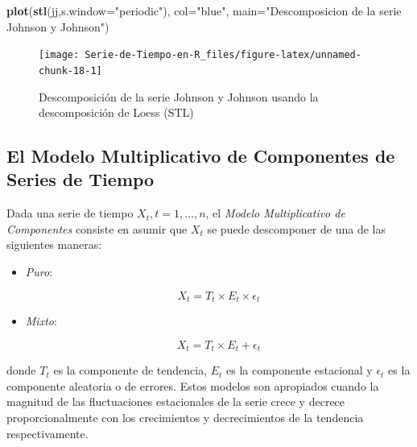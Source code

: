 \documentclass[12pt,]{krantz}
\makeatletter
\newenvironment{Shaded}{\begin{snugshade}}{\end{snugshade}}
\newcommand{\KeywordTok}[1]{\textcolor[rgb]{0.13,0.29,0.53}{\textbf{#1}}}
\newcommand{\DataTypeTok}[1]{\textcolor[rgb]{0.13,0.29,0.53}{#1}}
\newcommand{\StringTok}[1]{\textcolor[rgb]{0.31,0.60,0.02}{#1}}
\newcommand{\NormalTok}[1]{#1}
\providecommand{\tightlist}{%
  \setlength{\itemsep}{0pt}\setlength{\parskip}{0pt}}
\newenvironment{kframe}{%
\medskip{}
\setlength{\fboxsep}{.8em}
 \def\at@end@of@kframe{}%
 \ifinner\ifhmode%
  \def\at@end@of@kframe{\end{minipage}}%
  \begin{minipage}{\columnwidth}%
 \fi\fi%
 \def\FrameCommand##1{\hskip\@totalleftmargin \hskip-\fboxsep
 \colorbox{shadecolor}{##1}\hskip-\fboxsep
     \hskip-\linewidth \hskip-\@totalleftmargin \hskip\columnwidth}%
 \MakeFramed {\advance\hsize-\width
   \@totalleftmargin\z@ \linewidth\hsize
   \@setminipage}}%
 {\par\unskip\endMakeFramed%
 \at@end@of@kframe}
\renewenvironment{Shaded}{\begin{kframe}}{\end{kframe}}
\theoremstyle{definition}
\theoremstyle{definition}
\theoremstyle{definition}
\theoremstyle{remark}
\makeatother
\begin{document}
\begin{Shaded}
\begin{Highlighting}[]
\KeywordTok{plot}\NormalTok{(}\KeywordTok{stl}\NormalTok{(jj,}\DataTypeTok{s.window=}\StringTok{"periodic"}\NormalTok{), }\DataTypeTok{col=}\StringTok{"blue"}\NormalTok{,}
     \DataTypeTok{main=}\StringTok{"Descomposicion de la serie Johnson y Johnson"}\NormalTok{)}
\end{Highlighting}
\end{Shaded}

\begin{figure}

{\centering \texttt{[image: Serie-de-Tiempo-en-R\_files/figure-latex/unnamed-chunk-18-1]} 

}

\caption{Descomposición de la serie Johnson y Johnson usando la descomposición de Loess (STL)}\label{fig:unnamed-chunk-18}
\end{figure}

\subsection{El Modelo Multiplicativo de Componentes de Series de
Tiempo}\label{el-modelo-multiplicativo-de-componentes-de-series-de-tiempo}

Dada una serie de tiempo \(X_t,t=1,\ldots,n\), el \emph{Modelo
Multiplicativo de Componentes} consiste en asumir que \(X_t\) se puede
descomponer de una de las siguientes maneras:

\begin{itemize}
\tightlist
\item
  \emph{Puro}:

  \begin{equation}
  X_t = T_t\times E_t\times\epsilon_t
  \label{eq:eq-modelo-multiplicativo-puro}
  \end{equation}
\item
  \emph{Mixto}:

  \begin{equation}
  X_t = T_t\times E_t+\epsilon_t
  \label{eq:eq-modelo-multiplicativo-mixto}
  \end{equation}
\end{itemize}

donde \(T_t\) es la componente de tendencia, \(E_t\) es la componente
estacional y \(\epsilon_t\) es la componente aleatoria o de errores.
Estos modelos son apropiados cuando la magnitud de las fluctuaciones
estacionales de la serie crece y decrece proporcionalmente con los
crecimientos y decrecimientos de la tendencia respectivamente.
\end{document}

